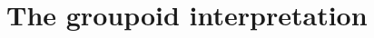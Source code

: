 \documentclass[runningheads,a4paper]{llncs}
\begin{document}


\section{The groupoid interpretation}
\label{sec:interpretation}








% 

%











% 


% 




\end{document}
